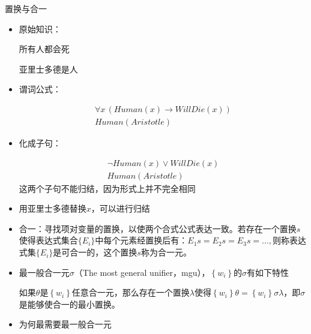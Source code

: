 \begin{note}
    置换与合一
    \begin{itemize}
        \item \textcolor{main1}{原始知识：}
        
        所有人都会死

        亚里士多德是人
        \item \textcolor{main1}{谓词公式：}
        
        \[
            \begin{array}{l}
                \forall x\,\left( Human(x)\to WillDie(x) \right)\\
                Human(Aristotle)
            \end{array}
        \]

        \item  \textcolor{main1}{化成子句：}
        
        \[
            \begin{array}{l}
                \lnot Human(x)\lor WillDie(x)\\
                Human(Aristotle)
            \end{array}
        \]
        这两个子句不能归结，因为形式上并不完全相同
        \item 用亚里士多德替换$x$，可以进行归结
        \item \textcolor{main1}{合一：}寻找项对变量的置换，以使两个合式公式表达一致。若存在一个置换$s$使得表达式集合$\{E_i\}$中每个元素经置换后有：$E_1s =E_2s = E_3s = \dots,$则称表达式集$\{E_i\}$是可合一的，这个置换$s$称为合一元。
        \item \textcolor{main1}{最一般合一元}$\sigma$（The most general unifier，mgu），$\left\{ w_i \right\}$的$\sigma$有如下特性

        如果$\theta$是$\left\{ w_i \right\}$任意合一元，那么存在一个置换$\lambda$使得$\left\{ w_i \right\}\theta = \left\{ w_i \right\}\sigma\lambda$，即$\sigma$是能够使合一的最小置换。
        \item 为何最需要最一般合一元
        

\end{itemize}
\end{note}
